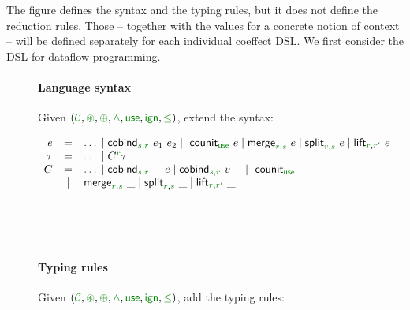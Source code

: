 \documentclass[
		twoside,openright,titlepage,numbers=noenddot,headinclude,%
                footinclude=true,cleardoublepage=empty,
                BCOR=10mm,paper=a4,fontsize=10pt, %
                ngerman,american, %
                ]{scrreprt}
\newcommand{\sep}[0]{\; | \;}
\newcommand{\ident}[1]{\textnormal{\sffamily #1}}
\newcommand{\ctyp}[2]{C^{#1}#2}
\newcommand{\cclrd}[1]{\textcolor{cclr}{#1}}
\newcommand{\czero}{ \textcolor{cclr}{ \mathsf{ign} } }
\newcommand{\cunit}{ \textcolor{cclr}{ \mathsf{use} } }
\newcommand{\cseq}{ \textcolor{cclr}{ \circledast }}
\newcommand{\cpar}{ \textcolor{cclr}{\oplus} }
\newcommand{\czip}{ \textcolor{cclr}{\wedge} } %
\newcommand{\cleq}{ \textcolor{cclr}{\leq} }
\newcommand{\C}{ {\textcolor{cclr}{\mathcal{C}}} }
\begin{document}
The figure defines the syntax and the typing rules, but it does not define the reduction rules.
Those -- together with the values for a concrete notion of context -- will be defined separately
for each individual coeffect DSL. We first consider the DSL for dataflow programming.


\begin{figure}[t]
\paragraph{Language syntax}
Given $(\C, \cseq, \cpar, \czip, \cunit, \czero, \cleq)$, extend the syntax:

\begin{equation*}
\begin{array}{rcl}
  e &  =  &\ldots \sep\ident{cobind}_{\cclrd{s},\cclrd{r}}~e_1~e_2 \sep \ident{counit}_{\cunit}~e \sep \ident{merge}_{\cclrd{r},\cclrd{s}}~e 
         \sep \ident{split}_{\cclrd{r},\cclrd{s}}~e \sep \ident{lift}_{\cclrd{r},\cclrd{r'}}~e \\
  \tau &  = &\ldots \sep \ctyp{\cclrd{r}}{\tau} \\
  C  & = &\ldots \sep \ident{cobind}_{\cclrd{s},\cclrd{r}}~\_~e \sep \ident{cobind}_{\cclrd{s},\cclrd{r}}~v~\_ \sep \ident{counit}_{\cunit}~\_ \\
    &\sep& \ident{merge}_{\cclrd{r},\cclrd{s}}~\_
           \sep \ident{split}_{\cclrd{r},\cclrd{s}}~\_ \sep \ident{lift}_{\cclrd{r},\cclrd{r'}}~\_ \\
  
\end{array}
\end{equation*}

~

~

\paragraph{Typing rules}
Given $(\C, \cseq, \cpar, \czip, \cunit, \czero, \cleq)$, add the typing rules:


\end{figure}
\end{document}
